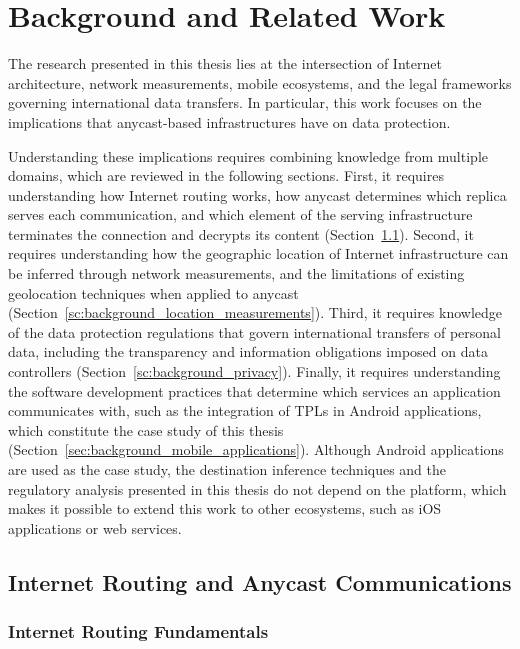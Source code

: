 \chapter{Background and Related Work}
\label{ch:background}

The research presented in this thesis lies at the intersection of Internet architecture, network measurements, mobile ecosystems, and the legal frameworks governing international data transfers. In particular, this work focuses on the implications that anycast-based infrastructures have on data protection.

Understanding these implications requires combining knowledge from multiple domains, which are reviewed in the following sections. First, it requires understanding how Internet routing works, how anycast determines which replica serves each communication, and which element of the serving infrastructure terminates the connection and decrypts its content (Section~\ref{sec:background_internet_routing}). Second, it requires understanding how the geographic location of Internet infrastructure can be inferred through network measurements, and the limitations of existing geolocation techniques when applied to anycast (Section~\ref{sc:background_location_measurements}). Third, it requires knowledge of the data protection regulations that govern international transfers of personal data, including the transparency and information obligations imposed on data controllers (Section~\ref{sc:background_privacy}). Finally, it requires understanding the software development practices that determine which services an application communicates with, such as the integration of TPLs in Android applications, which constitute the case study of this thesis (Section~\ref{sec:background_mobile_applications}). Although Android applications are used as the case study, the destination inference techniques and the regulatory analysis presented in this thesis do not depend on the platform, which makes it possible to extend this work to other ecosystems, such as iOS applications or web services.

\section{Internet Routing and Anycast Communications}
\label{sec:background_internet_routing}

\subsection{Internet Routing Fundamentals}
\label{sc:background_internet_routing_fundamentals}


